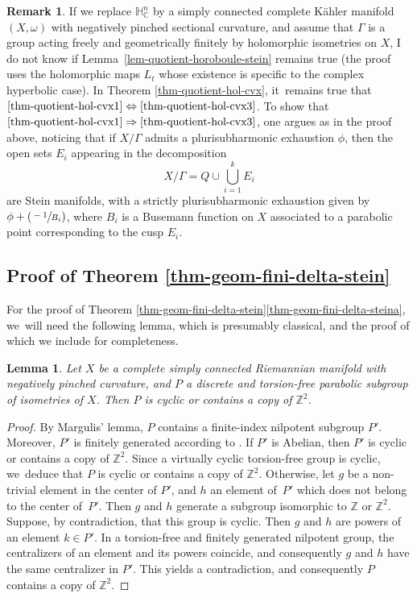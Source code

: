 \documentclass[JEP,XML,SOM,Unicode,NoEqCountersInSection,published]{cedram}
\newcommand{\Psfrac}[2]{(\sfrac{#1}{#2})}
\newtheorem{lemma}[theorem]{Lemma}
\theoremstyle{definition}
\newtheorem*{remark}{Remark}
\newcommand{\C}{\mathbb{C}}
\newcommand{\Z}{\mathbb{Z}}
\newcommand{\HNC}{\mathbb{H}^{n}_{\C}}
\def\C{\mathbb{C}}
\newcommand{\HNC}{\mathbb{H}^{n}_{\C}}
\begin{document}
\begin{remark}
If we replace $\HNC$ by a simply connected complete Kähler manifold $(X,\omega)$ with negatively pinched sectional curvature, and assume that $\Gamma$ is a group acting freely and geometrically finitely by holomorphic isometries on $X$, I do not know if Lemma~\ref{lem-quotient-horoboule-stein} remains true (the proof uses the holomorphic maps $L_t$ whose existence is specific to the complex hyperbolic case). In Theorem \ref{thm-quotient-hol-cvx}, it~remains true that $\eqref{thm-quotient-hol-cvx1}\Leftrightarrow\eqref{thm-quotient-hol-cvx3}$. To show that $\eqref{thm-quotient-hol-cvx1}\Rightarrow\eqref{thm-quotient-hol-cvx3}$, one argues as in the proof above, noticing that if $X/\Gamma$ admits a plurisubharmonic exhaustion $\phi$, then the open sets $E_i$ appearing in the decomposition
\begin{equation*}
X/\Gamma = Q\cup\bigcup_{i=1}^{k}E_i
\end{equation*}
are Stein manifolds, with a strictly plurisubharmonic exhaustion given by $\phi+\Psfrac{-1}{B_i}$, where $B_i$ is a Busemann function on $X$ associated to a parabolic point corresponding to the cusp $E_i$.
\end{remark}

\subsection{Proof of Theorem \ref{thm-geom-fini-delta-stein}}

For the proof of Theorem \ref{thm-geom-fini-delta-stein}\eqref{thm-geom-fini-delta-steina}, we~will need the following lemma, which is presumably classical, and the proof of which we include for completeness.

\begin{lemma}\label{lem_grp_parab_cyclique_ou_Z2}
Let $X$ be a complete simply connected Riemannian manifold with negatively pinched curvature, and $P$ a discrete and torsion-free parabolic subgroup of isometries of $X$. Then $P$ is cyclic or contains a copy of $\Z^{2}$.
\end{lemma}

\begin{proof}
By Margulis' lemma, $P$ contains a finite-index nilpotent subgroup $P'$. Moreover, $P'$ is finitely generated according to \cite{bowditchDiscreteParabolicGroups1993}. If $P'$ is Abelian, then $P'$ is cyclic or contains a copy of $\Z^{2}$. Since a virtually cyclic torsion-free group is cyclic, we~deduce that $P$ is cyclic or contains a copy of $\Z^{2}$. Otherwise, let $g$ be a non-trivial element in the center of $P'$, and $h$ an element of~$P'$ which does not belong to the center of~$P'$. Then $g$ and $h$ generate a subgroup isomorphic to $\Z$ or $\Z^{2}$. Suppose, by contradiction, that this group is cyclic. Then $g$ and $h$ are powers of an element $k\in P'$. In a torsion-free and finitely generated nilpotent group, the centralizers of an element and its powers coincide, and consequently $g$ and $h$ have the same centralizer in $P'$. This yields a contradiction, and consequently $P$ contains a copy of $\Z^{2}$.\qedhere
\end{proof}
\end{document}
